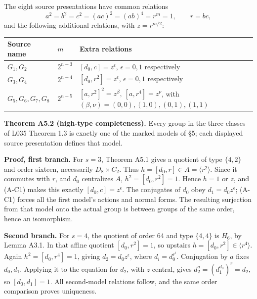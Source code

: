 \documentclass[
  11pt,
  a4paper,
]{article}
\newcounter{none} %
\begin{document}
The eight source presentations have common relations \[
 a^2=b^2=c^2=(ac)^2=(ab)^4=r^m=1,\qquad r=bc,
\] and the following additional relations, with \(z=r^{m/2}\):

{\def\LTcaptype{none} %
\begin{longtable}[]{@{}
  >{\raggedright\arraybackslash}p{}
  >{\raggedright\arraybackslash}p{}
  >{\raggedright\arraybackslash}p{}@{}}
\toprule\noalign{}
\begin{minipage}[b]{\linewidth}\raggedright
Source name
\end{minipage} & \begin{minipage}[b]{\linewidth}\raggedright
\(m\)
\end{minipage} & \begin{minipage}[b]{\linewidth}\raggedright
Extra relations
\end{minipage} \\
\midrule\noalign{}
\endhead
\bottomrule\noalign{}
\endlastfoot
\(G_1,G_2\) & \(2^{n-3}\) & \([d_0,c]=z^\epsilon\), \(\epsilon=0,1\)
respectively \\
\(G_3,G_4\) & \(2^{n-4}\) & \([d_0,r^2]=z^\epsilon\), \(\epsilon=0,1\)
respectively \\
\(G_5,G_6,G_7,G_8\) & \(2^{n-5}\) &
\([a,r^2]^2=z^\beta,\ [a,r^4]=z^\nu\), with
\((\beta,\nu)=(0,0),(1,0),(0,1),(1,1)\) \\
\end{longtable}
}

\textbf{Theorem A5.2 (high-type completeness).} Every group in the three
classes of L035 Theorem 1.3 is exactly one of the marked models of §5;
each displayed source presentation defines that model.

\textbf{Proof, first branch.} For \(s=3\), Theorem A5.1 gives a quotient
of type \(\{4,2\}\) and order sixteen, necessarily \(D_8\times C_2\).
Thus \(h=[d_0,r]\in A=\langle r^2\rangle\). Since it commutes with
\(r\), and \(d_0\) centralizes \(A\), \(h^2=[d_0,r^2]=1\). Hence \(h=1\)
or \(z\), and (A-C1) makes this exactly \([d_0,c]=z^\epsilon\). The
conjugates of \(d_0\) obey \(d_1=d_0z^\epsilon\); (A-C1) forces all the
first model's actions and normal forms. The resulting surjection from
that model onto the actual group is between groups of the same order,
hence an isomorphism.

\textbf{Second branch.} For \(s=4\), the quotient of order 64 and type
\(\{4,4\}\) is \(H_6\), by Lemma A3.1. In that affine quotient
\([d_0,r^2]=1\), so upstairs \(h=[d_0,r^2]\in\langle r^4\rangle\). Again
\(h^2=[d_0,r^4]=1\), giving \(d_2=d_0z^\epsilon\), where
\(d_i=d_0^{r^i}\). Conjugation by \(a\) fixes \(d_0,d_1\). Applying it
to the equation for \(d_2\), with \(z\) central, gives
\(d_2^a=(d_1^{d_0})^r=d_2\), so \([d_0,d_1]=1\). All second-model
relations follow, and the same order comparison proves uniqueness.
\end{document}
